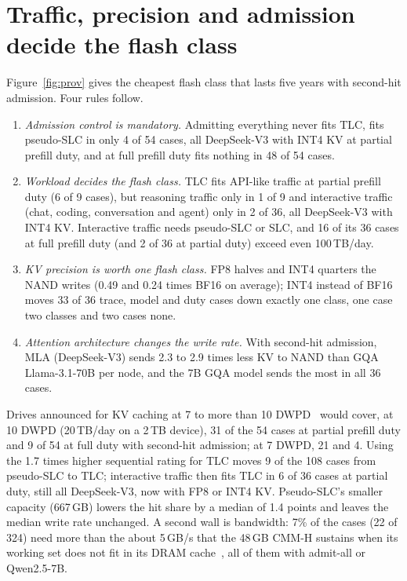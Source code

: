 \documentclass[acmsmall,screen,review]{acmart}
\begin{document}
\section{Traffic, precision and admission decide the flash class}
\label{sec:prov}
Figure~\ref{fig:prov} gives the cheapest flash class that lasts five years with second-hit
admission. Four rules follow.
\begin{enumerate}
\item \emph{Admission control is mandatory.} Admitting everything never fits TLC, fits pseudo-SLC in
only 4 of 54 cases, all DeepSeek-V3 with INT4 KV at partial prefill duty, and at full prefill duty fits
nothing in 48 of 54 cases.
\item \emph{Workload decides the flash class.} TLC fits API-like traffic at partial prefill duty
(6 of 9 cases), but reasoning traffic only in 1 of 9 and interactive traffic (chat, coding,
conversation and agent) only in 2 of 36, all DeepSeek-V3 with INT4 KV. Interactive
traffic needs pseudo-SLC or SLC, and 16 of its 36 cases at full prefill duty (and 2 of 36 at partial
duty) exceed even 100\,TB/day.
\item \emph{KV precision is worth one flash class.} FP8 halves and INT4 quarters the NAND
writes (0.49 and 0.24 times BF16 on average); INT4 instead of BF16 moves 33 of 36 trace, model and
duty cases down exactly one class, one case two classes and two cases none.
\item \emph{Attention architecture changes the write rate.} With second-hit admission, MLA
(DeepSeek-V3) sends 2.3 to 2.9 times less KV to NAND than GQA Llama-3.1-70B per node, and the 7B GQA
model sends the most in all 36 cases.
\end{enumerate}
Drives announced for KV caching at 7 to more than 10 DWPD~\cite{scaleflux} would cover, at 10 DWPD
(20\,TB/day on a 2\,TB device), 31 of the 54 cases at partial prefill duty and 9 of 54 at full duty with
second-hit admission; at 7 DWPD, 21 and 4. Using the 1.7 times higher sequential rating for TLC moves 9 of the 108 cases from pseudo-SLC to
TLC; interactive traffic then fits TLC in 6 of 36 cases at partial duty, still all DeepSeek-V3, now
with FP8 or INT4 KV. Pseudo-SLC's smaller capacity (667\,GB) lowers the hit share by a median of 1.4 points
and leaves the median write rate unchanged. A second wall is bandwidth: 7\% of the
cases (22 of 324) need more than the about 5\,GB/s that the 48\,GB CMM-H sustains when its working
set does not fit in its DRAM cache~\cite{cmmh_hs}, all of them with admit-all or Qwen2.5-7B.
\end{document}
